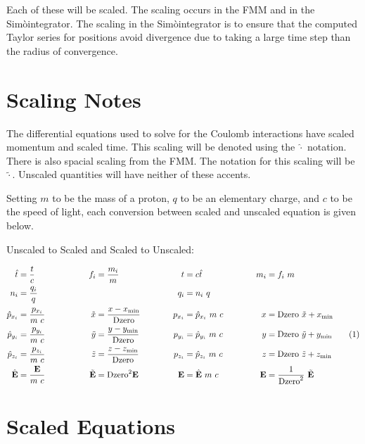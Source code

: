 \documentclass[oneside,12pt]{book}
\renewcommand{\vec}{\mathbf}
\newcommand\numberthis{\addtocounter{equation}{1}\tag{\theequation}}
\newcommand{\Simo}{Sim\`{o}}
\begin{document}
Each of these will be scaled.  The scaling occurs in the FMM and in the \Simo integrator.  The scaling in the \Simo integrator is to ensure that the computed Taylor series for positions avoid divergence due to taking a large time step than the radius of convergence.

\section{Scaling Notes}
\label{sec:Scaling_Notes}
The differential equations used to solve for the Coulomb interactions have scaled momentum and scaled time.  This scaling will be denoted using the {\Large $\hat{\cdot}$} notation.  There is also spacial scaling from the FMM.  The notation for this scaling will be {\Large $\tilde{\cdot}$}. Unscaled quantities will have neither of these accents.

Setting $m$ to be the mass of a proton, $q$ to be an elementary charge, and $c$ to be the speed of light, each conversion between scaled and unscaled equation is given below.

Unscaled to Scaled and Scaled to Unscaled:

\begin{align*}
\hat{t}&=\dfrac{t}{c} \hspace{0.75in} & f_i&=\dfrac{m_i}{m} \hspace{0.75in}& t&=c\hat{t} \hspace{0.75in}& m_i&=f_i \ m\\
n_i&=\dfrac{q_i}{q} & & & q_i&=n_i \ q\\
\hat{p}_{x_i}&=\dfrac{p_{x_i}}{m \ c} & \tilde{x}&=\dfrac{x-x_{\min}}{\text{Dzero}} & p_{x_i}&=\hat{p}_{x_i} \ m \ c & x&=\text{Dzero} \ \tilde{x} + x_{\min}\\
\hat{p}_{y_i}&=\dfrac{p_{y_i}}{m \ c} & \tilde{y}&=\dfrac{y-y_{\min}}{\text{Dzero}} & p_{y_i}&=\hat{p}_{y_i} \ m \ c & y&=\text{Dzero} \ \tilde{y} + y_{\min} \numberthis \label{scalingvariables} \\ 
\hat{p}_{z_i}&=\dfrac{p_{z_i}}{m \ c} & \tilde{z}&=\dfrac{z-z_{\min}}{\text{Dzero}} & p_{z_i}&=\hat{p}_{z_i} \ m \ c & z&=\text{Dzero} \ \tilde{z} + z_{\min}\\
\hat{\vec{E}}&=\dfrac{\vec{E}}{m \ c} & \tilde{\vec{E}}&={\text{Dzero}}^2 \vec{E} & \vec{E}&=\hat{\vec{E}} \ m \ c & \vec{E}&=\dfrac{1}{{\text{Dzero}}^2} \ \tilde{\vec{E}}
\end{align*}

\section{Scaled Equations}
\end{document}
